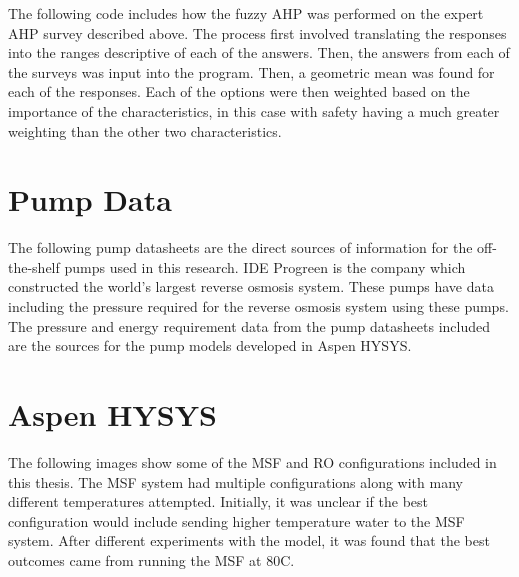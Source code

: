 \documentclass[12pt]{UIdahoMastersThesis}
\begin{document}
The following code includes how the fuzzy AHP was performed on the expert AHP survey described above.  The process first involved translating the responses into the ranges descriptive of each of the answers.  Then, the answers from each of the surveys was input into the program.  Then, a geometric mean was found for each of the responses.  Each of the options were then weighted based on the importance of the characteristics, in this case with safety having a much greater weighting than the other two characteristics.





\chapter{Pump Data}
\label{Appendix:pumps}

The following pump datasheets are the direct sources of information for the off-the-shelf pumps used in this research.  IDE Progreen is the company which constructed the world's largest reverse osmosis system.  These pumps have data including the pressure required for the reverse osmosis system using these pumps. The pressure and energy requirement data from the pump datasheets included are the sources for the pump models developed in Aspen HYSYS.


%

\chapter{Aspen HYSYS}
\label{HYSYSDiagrams}

The following images show some of the MSF and RO configurations included in this thesis.  The MSF system had multiple configurations along with many different temperatures attempted.  Initially, it was unclear if the best configuration would include sending higher temperature water to the MSF system.  After different experiments with the model, it was found that the best outcomes came from running the MSF at 80\degree C.
\end{document}
